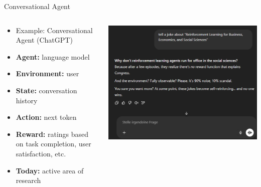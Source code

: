 \documentclass[11pt,table]{beamer}
\begin{document}
\begin{frame}{Conversational Agent}

    \begin{columns}[T]
\begin{column}{0.55\textwidth}
\begin{itemize}
\item  Example: Conversational Agent (ChatGPT)
\item  \textbf{Agent:} language model
\item \textbf{Environment:} user
\item \textbf{State:} conversation history
\item \textbf{Action:} next token 
\item \textbf{Reward:} ratings based on task completion, user satisfaction, etc.
\item \textbf{Today:} active area of research


\end{itemize}
\end{column}
\begin{column}{0.45\textwidth}
\centering
        \includegraphics[scale=0.30]{figures/conversational_agent.png}
\end{column}
\end{columns}
\end{frame}
\end{document}
